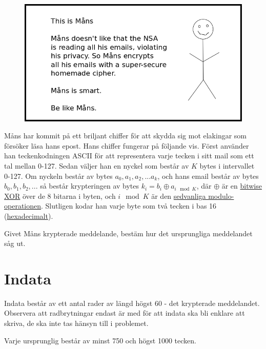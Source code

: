 
\begin{center}
  \begin{figure}[h!]
    \includegraphics[width=\textwidth]{mans.png}
  \end{figure}
\end{center}

Måns har kommit på ett briljant chiffer för att skydda sig mot elakingar som försöker läsa hans epost. Hans chiffer fungerar på följande vis. Först använder han teckenkodningen ASCII för att representera varje tecken i sitt mail som ett tal mellan 0-127. Sedan väljer han en nyckel som består av $K$ bytes i intervallet 0-127. Om nyckeln består av bytes $a_0, a_1, a_2, ... a_k$, och hans email består av bytes $b_0, b_1, b_2, ...$ så består krypteringen
av bytes $k_i = b_i \oplus a_{i \mod K}$, där $\oplus$ är en \href{https://en.wikipedia.org/wiki/Bitwise\_operation#XOR}{bitwise XOR} över de 8 bitarna i byten, och $i \mod K$ är den \href{https://en.wikipedia.org/wiki/Modulo\_operation}{sedvanliga modulo-operationen}. Slutligen kodar han varje byte som två tecken i bas 16 (\href{https://en.wikipedia.org/wiki/Hexadecimal}{hexadecimalt}).

Givet Måns krypterade meddelande, bestäm hur det ursprungliga meddelandet såg ut.

\section*{Indata}
Indata består av ett antal rader av längd högst 60 - det krypterade meddelandet. Observera att radbrytningar endast är med för att indata ska bli enklare att skriva, de ska inte tas hänsyn till i problemet.

Varje ursprunglig består av minst 750 och högst 1000 tecken.

